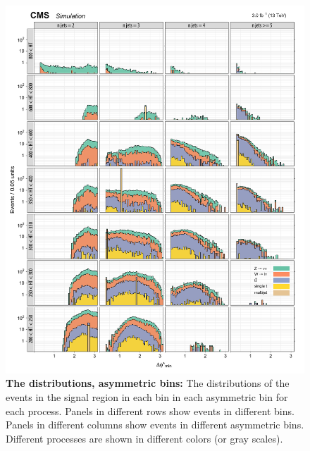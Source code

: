 \begin{figure}[!h]
\centering
\includegraphics[scale=0.95]{figures/kiplots/c150107_s150318_f015_biasedDPhi_40}
\caption{\textbf{\boldmath The \bdphi distributions, asymmetric \njet
bins:} The \bdphi distributions of the events in the signal region in
each \scalht bin in each asymmetric \njet bin for each process. Panels
in different rows show events in different \scalht bins. Panels in
different columns show events in different asymmetric \njet bins.
Different processes are shown in different colors (or gray scales).}
\label{c150107_s150318_f015_biasedDPhi_40}
\end{figure}

